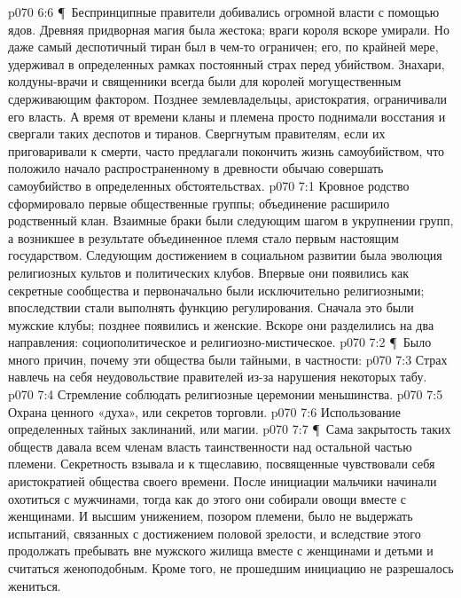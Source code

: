 \vs p070 6:6 \P\ Беспринципные правители добивались огромной власти с помощью ядов. Древняя придворная магия была жестока; враги короля вскоре умирали. Но даже самый деспотичный тиран был в чем\hyp{}то ограничен; его, по крайней мере, удерживал в определенных рамках постоянный страх перед убийством. Знахари, колдуны\hyp{}врачи и священники всегда были для королей могущественным сдерживающим фактором. Позднее землевладельцы, аристократия, ограничивали его власть. А время от времени кланы и племена просто поднимали восстания и свергали таких деспотов и тиранов. Свергнутым правителям, если их приговаривали к смерти, часто предлагали покончить жизнь самоубийством, что положило начало распространенному в древности обычаю совершать самоубийство в определенных обстоятельствах.
\vs p070 7:1 Кровное родство сформировало первые общественные группы; объединение расширило родственный клан. Взаимные браки были следующим шагом в укрупнении групп, а возникшее в результате объединенное племя стало первым настоящим государством. Следующим достижением в социальном развитии была эволюция религиозных культов и политических клубов. Впервые они появились как секретные сообщества и первоначально были исключительно религиозными; впоследствии стали выполнять функцию регулирования. Сначала это были мужские клубы; позднее появились и женские. Вскоре они разделились на два направления: социополитическое и религиозно\hyp{}мистическое.
\vs p070 7:2 \P\ Было много причин, почему эти общества были тайными, в частности:
\vs p070 7:3 \bibnobreakspace Страх навлечь на себя неудовольствие правителей из\hyp{}за нарушения некоторых табу.
\vs p070 7:4 \bibnobreakspace Стремление соблюдать религиозные церемонии меньшинства.
\vs p070 7:5 \bibnobreakspace Охрана ценного «духа», или секретов торговли.
\vs p070 7:6 \bibnobreakspace Использование определенных тайных заклинаний, или магии.
\vs p070 7:7 \P\ Сама закрытость таких обществ давала всем членам власть таинственности над остальной частью племени. Секретность взывала и к тщеславию, посвященные чувствовали себя аристократией общества своего времени. После инициации мальчики начинали охотиться с мужчинами, тогда как до этого они собирали овощи вместе с женщинами. И высшим унижением, позором племени, было не выдержать испытаний, связанных с достижением половой зрелости, и вследствие этого продолжать пребывать вне мужского жилища вместе с женщинами и детьми и считаться женоподобным. Кроме того, не прошедшим инициацию не разрешалось жениться.
